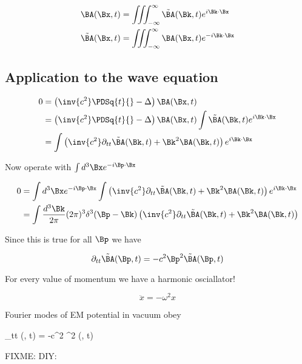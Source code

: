 \begin{align}\label{eqn:relativisticElectrodynamicsL15:n}
\BA(\Bx, t) &= \iiint_{-\infty}^\infty \tilde{\BA}(\Bk, t) e^{i \Bk \cdot \Bx} \\
\tilde{\BA}(\Bx, t) &= \iiint_{-\infty}^\infty \BA(\Bx, t) e^{-i \Bk \cdot \Bx}
\end{align}

\subsection{Application to the wave equation}

\begin{align*}
0 &= 
\left( \inv{c^2} \PDSq{t}{} - \Delta \right) \BA(\Bx, t) \\
&=
\left( \inv{c^2} \PDSq{t}{} - \Delta \right) \BA(\Bx, t)
\int \tilde{\BA}(\Bk, t) e^{i \Bk \cdot \Bx} \\
&=
\int 
\left( 
\inv{c^2} \partial_{tt} \tilde{\BA}(\Bk, t) + \Bk^2 \BA(\Bk, t)
\right)
e^{i \Bk \cdot \Bx} 
\end{align*}

Now operate with $\int d^3 \Bx e^{-i \Bp \cdot \Bx }$

\begin{align*}
0 &=
\int d^3 \Bx e^{-i \Bp \cdot \Bx }
\int 
\left( 
\inv{c^2} \partial_{tt} \tilde{\BA}(\Bk, t) + \Bk^2 \BA(\Bk, t)
\right)
e^{i \Bk \cdot \Bx}  \\
&=
\int \frac{d^3 \Bk}{2\pi} (2\pi)^3 \delta^3(\Bp -\Bk) 
\left( 
\inv{c^2} \partial_{tt} \tilde{\BA}(\Bk, t) + \Bk^2 \BA(\Bk, t)
\right)
\end{align*}

Since this is true for all $\Bp$ we have

\begin{equation}\label{eqn:relativisticElectrodynamicsL15:n}
\partial_{tt} \tilde{\BA}(\Bp, t) = -c^2 \Bp^2 \tilde{\BA}(\Bp, t) 
\end{equation}

For every value of momentum we have a harmonic osciallator!

\begin{equation}\label{eqn:relativisticElectrodynamicsL15:n}
\ddot{x} = -\omega^2 x
\end{equation}

Fourier modes of EM potential in vacuum obey

\partial_{tt} \tilde{\BA}(\Bk, t) = -c^2 \Bk^2 \tilde{\BA}(\Bk, t)

FIXME: DIY:

